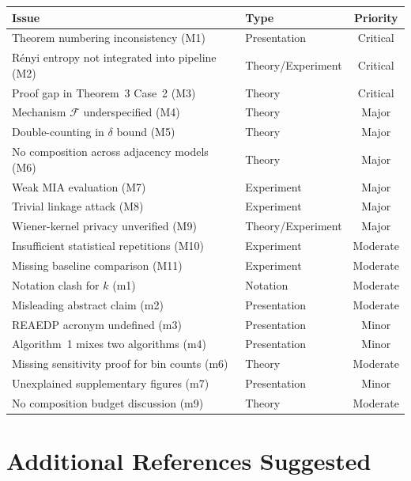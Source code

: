 \documentclass[12pt]{article}
\begin{document}
\begin{center}
\begin{tabular}{@{}llc@{}}
\toprule
\textbf{Issue} & \textbf{Type} & \textbf{Priority} \\
\midrule
Theorem numbering inconsistency (M1) & Presentation & Critical \\
Rényi entropy not integrated into pipeline (M2) & Theory/Experiment & Critical \\
Proof gap in Theorem~3 Case~2 (M3) & Theory & Critical \\
Mechanism $\mathcal{F}$ underspecified (M4) & Theory & Major \\
Double-counting in $\delta$ bound (M5) & Theory & Major \\
No composition across adjacency models (M6) & Theory & Major \\
Weak MIA evaluation (M7) & Experiment & Major \\
Trivial linkage attack (M8) & Experiment & Major \\
Wiener-kernel privacy unverified (M9) & Theory/Experiment & Major \\
Insufficient statistical repetitions (M10) & Experiment & Moderate \\
Missing baseline comparison (M11) & Experiment & Moderate \\
Notation clash for $k$ (m1) & Notation & Moderate \\
Misleading abstract claim (m2) & Presentation & Moderate \\
REAEDP acronym undefined (m3) & Presentation & Minor \\
Algorithm~1 mixes two algorithms (m4) & Presentation & Minor \\
Missing sensitivity proof for bin counts (m6) & Theory & Moderate \\
Unexplained supplementary figures (m7) & Presentation & Minor \\
No composition budget discussion (m9) & Theory & Moderate \\
\bottomrule
\end{tabular}
\end{center}

\section{Additional References Suggested}
\end{document}
